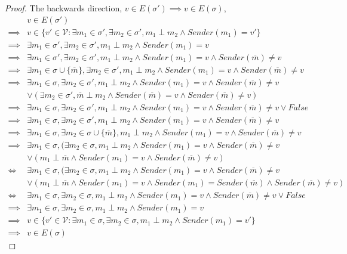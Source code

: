 \begin{proof}
The backwards direction, $v \in E(\sigma') \implies v \in E(\sigma)$,
\begin{align}
        &v \in E(\sigma') \\
\implies& v \in \{v' \in \mathcal{V}: \exists m_1 \in \sigma', \exists m_2 \in \sigma', m_1 \perp m_2 \land Sender(m_1) = v' \} \\
\implies& \exists m_1 \in \sigma', \exists m_2 \in \sigma', m_1 \perp m_2 \land Sender(m_1) = v \\
\implies& \exists m_1 \in \sigma', \exists m_2 \in \sigma', m_1 \perp m_2 \land Sender(m_1) = v \land Sender(\overline{m}) \neq v \\
\implies& \exists m_1 \in \sigma \cup \{\overline{m}\}, \exists m_2 \in \sigma', m_1 \perp m_2 \land Sender(m_1) = v \land Sender(\overline{m}) \neq v \\
\implies& \exists m_1 \in \sigma, \exists m_2 \in \sigma', m_1 \perp m_2 \land Sender(m_1) = v \land Sender(\overline{m}) \neq v \\
        &\lor (\exists m_2 \in \sigma', \overline{m} \perp m_2 \land Sender(\overline{m}) = v \land Sender(\overline{m}) \neq v) \\
\implies& \exists m_1 \in \sigma, \exists m_2 \in \sigma', m_1 \perp m_2 \land Sender(m_1) = v \land Sender(\overline{m}) \neq v \lor False \\
\implies& \exists m_1 \in \sigma, \exists m_2 \in \sigma', m_1 \perp m_2 \land Sender(m_1) = v \land Sender(\overline{m}) \neq v \\
\implies& \exists m_1 \in \sigma, \exists m_2 \in \sigma \cup \{\overline{m}\}, m_1 \perp m_2 \land Sender(m_1) = v \land Sender(\overline{m}) \neq v \\
\implies& \exists m_1 \in \sigma, (\exists m_2 \in \sigma, m_1 \perp m_2 \land Sender(m_1) = v \land Sender(\overline{m}) \neq v \\
        &\lor (m_1 \perp \overline{m} \land Sender(m_1) = v \land Sender(\overline{m}) \neq v) \\
\iff& \exists m_1 \in \sigma, (\exists m_2 \in \sigma, m_1 \perp m_2 \land Sender(m_1) = v \land Sender(\overline{m}) \neq v\\
        &\lor (m_1 \perp \overline{m} \land Sender(m_1) = v \land Sender(m_1) = Sender(\overline{m}) \land Sender(\overline{m}) \neq v) \\
\iff& \exists m_1 \in \sigma, \exists m_2 \in \sigma, m_1 \perp m_2 \land Sender(m_1) = v \land Sender(\overline{m}) \neq v \lor False \\
\implies& \exists m_1 \in \sigma, \exists m_2 \in \sigma, m_1 \perp m_2 \land Sender(m_1) = v \\
\implies& v \in \{ v' \in \mathcal{V} : \exists m_1 \in \sigma, \exists m_2 \in \sigma, m_1 \perp m_2 \land Sender(m_1) = v' \} \\
\implies& v \in E(\sigma)
\end{align}
\end{proof}


